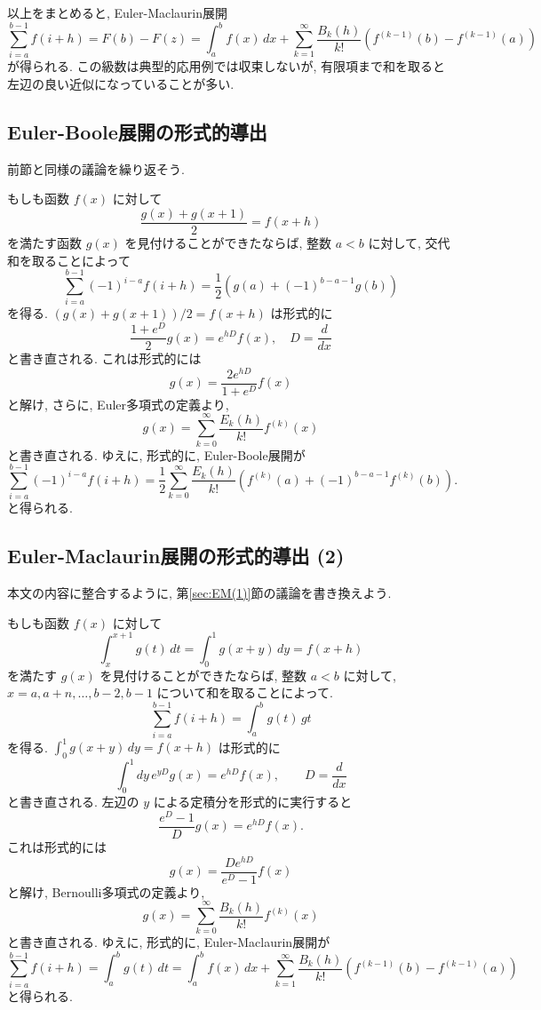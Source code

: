 \documentclass[12pt,twoside]{jarticle}
\theoremstyle{jplain}
\theoremstyle{jplain}
\theoremstyle{jplain}
\numberwithin{theorem}{section}
\numberwithin{equation}{section}
\numberwithin{figure}{section}
\numberwithin{table}{section}
\newcommand\secref[1]{第\ref{#1}節}
\begin{document}
以上をまとめると, Euler-Maclaurin展開
\[
  \sum_{i=a}^{b-1}f(i+h)
  = F(b)-F(z)
  = \int_a^b f(x)\,dx
  + \sum_{k=1}^\infty \frac{B_k(h)}{k!}(f^{(k-1)}(b)-f^{(k-1)}(a))
\]
が得られる. この級数は典型的応用例では収束しないが,
有限項まで和を取ると左辺の良い近似になっていることが多い.


\subsection{Euler-Boole展開の形式的導出}

前節と同様の議論を繰り返そう.

もしも函数 $f(x)$ に対して
\[
  \frac{g(x) + g(x+1)}{2} = f(x+h)
\]
を満たす函数 $g(x)$ を見付けることができたならば,
整数 $a<b$ に対して, 交代和を取ることによって
\[
  \sum_{i=a}^{b-1}(-1)^{i-a} f(i+h)
  = \frac12(g(a) + (-1)^{b-a-1}g(b))
\]
を得る.  $(g(x)+g(x+1))/2=f(x+h)$ は形式的に
\[
  \frac{1+e^D}{2}g(x) = e^{hD}f(x), \quad D = \frac{d}{dx}
\]
と書き直される. これは形式的には
\[
  g(x) = \frac{2e^{hD}}{1+e^D}f(x)
\]
と解け, さらに, Euler多項式の定義より,
\[
  g(x) = \sum_{k=0}^\infty \frac{E_k(h)}{k!}f^{(k)}(x)
\]
と書き直される. ゆえに, 形式的に, Euler-Boole展開が
\[
  \sum_{i=a}^{b-1}(-1)^{i-a} f(i+h)
  =\frac12\sum_{k=0}^\infty\frac{E_k(h)}{k!}(f^{(k)}(a)+(-1)^{b-a-1}f^{(k)}(b)).
\]
と得られる.


\subsection{Euler-Maclaurin展開の形式的導出 (2)}

本文の内容に整合するように,
\secref{sec:EM(1)}の議論を書き換えよう.

もしも函数 $f(x)$ に対して
\[
  \int_x^{x+1}g(t)\,dt = \int_0^1 g(x+y)\,dy = f(x+h)
\]
を満たす $g(x)$ を見付けることができたならば,
整数 $a<b$ に対して, $x=a,a+n,\ldots,b-2,b-1$ について和を取ることによって.
\[
  \sum_{i=a}^{b-1} f(i+h) = \int_a^b g(t)\,gt
\]
を得る. $\int_0^1 g(x+y)\,dy=f(x+h)$ は形式的に
\[
  \int_0^1 dy\,e^{yD}g(x) = e^{hD}f(x), \qquad D=\frac{d}{dx}
\]
と書き直される. 左辺の $y$ による定積分を形式的に実行すると
\[
  \frac{e^D-1}{D}g(x) = e^{hD}f(x).
\]
これは形式的には
\[
  g(x) = \frac{De^{hD}}{e^D-1}f(x)
\]
と解け, Bernoulli多項式の定義より,
\[
  g(x) = \sum_{k=0}^\infty \frac{B_k(h)}{k!}f^{(k)}(x)
\]
と書き直される. ゆえに, 形式的に, Euler-Maclaurin展開が
\[
  \sum_{i=a}^{b-1}f(i+h)
  = \int_a^b g(t)\,dt
  = \int_a^b f(x)\,dx
  + \sum_{k=1}^\infty \frac{B_k(h)}{k!}(f^{(k-1)}(b)-f^{(k-1)}(a))
\]
と得られる.
\end{document}
